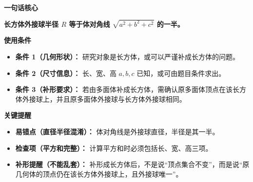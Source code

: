 \begin{summarybox}
	\textbf{\textcolor{CSummary}{一句话核心}}

	\textbf{长方体外接球半径 $R$ 等于体对角线 $\sqrt{a^2+b^2+c^2}$ 的一半。}

	\medskip
	\textbf{\textcolor{CSummary}{使用条件}}
	\begin{itemize}[leftmargin=*, itemsep=0.5em, topsep=0.4em]
		\item \textbf{条件 1（几何形状）：} 研究对象是长方体，或可以严谨补成长方体的问题。
		\item \textbf{条件 2（尺寸信息）：} 长、宽、高 $a,b,c$ 已知，或可由题目条件求出。
		\item \textbf{条件 3（补形要求）：} 若由多面体补成长方体，需确认原多面体顶点在该长方体外接球上，并且原多面体外接球与长方体外接球相同。
	\end{itemize}

	\medskip
	\textbf{\textcolor{CSummary}{关键提醒}}
	\begin{itemize}[leftmargin=*, itemsep=0.5em, topsep=0.4em]
		\item \textbf{易错点（直径半径混淆）：} 体对角线是外接球直径，半径是其一半。
		\item \textbf{检查项（平方和完整）：} 计算平方和时必须包括长、宽、高三项。
		\item \textbf{补形提醒（不能乱套）：} 补形成长方体后，不是说“顶点集合不变”，而是说“原几何体的顶点仍在该长方体外接球上，且外接球唯一”。
	\end{itemize}
\end{summarybox}